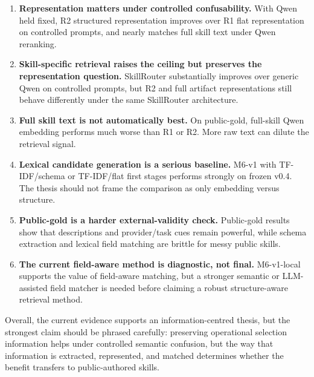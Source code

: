 \begin{enumerate}
  \item \textbf{Representation matters under controlled confusability.} With Qwen held fixed, R2 structured representation improves over R1 flat representation on controlled prompts, and nearly matches full skill text under Qwen reranking.
  \item \textbf{Skill-specific retrieval raises the ceiling but preserves the representation question.} SkillRouter substantially improves over generic Qwen on controlled prompts, but R2 and full artifact representations still behave differently under the same SkillRouter architecture.
  \item \textbf{Full skill text is not automatically best.} On public-gold, full-skill Qwen embedding performs much worse than R1 or R2. More raw text can dilute the retrieval signal.
  \item \textbf{Lexical candidate generation is a serious baseline.} M6-v1 with TF-IDF/schema or TF-IDF/flat first stages performs strongly on frozen v0.4. The thesis should not frame the comparison as only embedding versus structure.
  \item \textbf{Public-gold is a harder external-validity check.} Public-gold results show that descriptions and provider/task cues remain powerful, while schema extraction and lexical field matching are brittle for messy public skills.
  \item \textbf{The current field-aware method is diagnostic, not final.} M6-v1-local supports the value of field-aware matching, but a stronger semantic or LLM-assisted field matcher is needed before claiming a robust structure-aware retrieval method.
\end{enumerate}

Overall, the current evidence supports an information-centred thesis, but the strongest claim should be phrased carefully: preserving operational selection information helps under controlled semantic confusion, but the way that information is extracted, represented, and matched determines whether the benefit transfers to public-authored skills.
